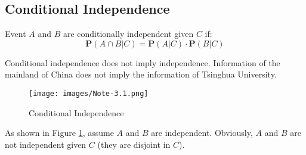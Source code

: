 \documentclass[device=normal, lang=en, fontsize=12pt]{elegantnote}
\numberwithin{equation}{section}
\begin{document}
\subsection{Conditional Independence}
\begin{definition}
    Event $A$ and $B$ are conditionally independent given $C$ if:
    \begin{equation}
        \mathbf{P}(A \cap B | C) = \mathbf{P}(A | C) \cdot \mathbf{P}(B | C)
    \end{equation}
\end{definition}
\begin{remark}
    Conditional independence does not imply independence. Information of the mainland of China does not imply the information of Tsinghua University.
\begin{figure}[H]
    \centering
    \texttt{[image: images/Note-3.1.png]}
    \caption{Conditional Independence}
    \label{fig:conditional-independence}
\end{figure}
As shown in Figure \ref{fig:conditional-independence}, assume $A$ and $B$ are independent. Obviously, $A$ and $B$ are not independent given $C$ (they are disjoint in $C$).
\end{remark}
\end{document}
